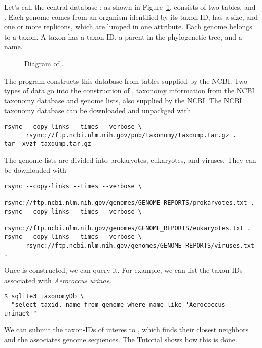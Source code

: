Let's call the central database ; as shown in
Figure~\ref{fig:db},  consists of two
tables,  and . Each genome comes from an organism
identified by its taxon-ID, has a size, and one or more replicons,
which are lumped in one attribute. Each genome belongs to a taxon. A
taxon has a taxon-ID, a parent in the phylogenetic tree, and a name.

\begin{figure}
  \begin{center}
    
  \end{center}
  \caption{Diagram of .}\label{fig:db}
\end{figure}

The program  constructs this database from tables
supplied by the NCBI. Two types of data go into the construction
of , taxonomy information from the NCBI taxonomy
database and genome lists, also supplied by the NCBI. The NCBI
taxonomy database can be downloaded and unpackged with
\begin{verbatim}
rsync --copy-links --times --verbose \
      rsync://ftp.ncbi.nlm.nih.gov/pub/taxonomy/taxdump.tar.gz .
tar -xvzf taxdump.tar.gz
\end{verbatim}
The genome lists are divided into prokaryotes, eukaryotes, and
viruses. They can be downloaded with
\begin{verbatim}
rsync --copy-links --times --verbose \
      rsync://ftp.ncbi.nlm.nih.gov/genomes/GENOME_REPORTS/prokaryotes.txt .
rsync --copy-links --times --verbose \
      rsync://ftp.ncbi.nlm.nih.gov/genomes/GENOME_REPORTS/eukaryotes.txt .
rsync --copy-links --times --verbose \
      rsync://ftp.ncbi.nlm.nih.gov/genomes/GENOME_REPORTS/viruses.txt .
\end{verbatim}

Once \ty{taxonomyDb} is constructed, we can query it. For example, we
can list the taxon-IDs associated with \emph{Aerococcus urinae}.
\begin{verbatim}
$ sqlite3 taxonomyDb \
  "select taxid, name from genome where name like 'Aerococcus urinae%'"
\end{verbatim}

We can submit the taxon-IDs of interes to , which finds
their closest neighbors and the associates genome sequences. The
Tutorial shows how this is done.
